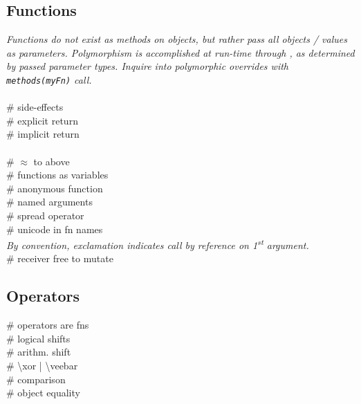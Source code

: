 \subsection*{Functions}
\textit{Functions do not exist as methods on  objects, but rather pass all objects / values as parameters. Polymorphism is accomplished at run-time through , as determined by passed parameter types. Inquire into polymorphic overrides with \texttt{methods(myFn)} call.}\\
\\
 \# side-effects \\
 \# explicit return \\
 \# implicit return \\
\\
 \# $\approx$ to above\\
 \# functions as variables\\
 \# anonymous function \\
 \# named arguments \\
 \# spread operator \\
 \# unicode in fn names\\[2mm]
\textit{By convention, exclamation indicates call by reference on 1\textsuperscript{st} argument.} \\
 \# receiver free to mutate\\



\subsection*{Operators}
 \# operators are fns \\
\mycolX{30mm}{\code{$>>\hspace{3mm}<<$}} \# logical shifts\\
\mycolX{30mm}{\code{$>>>\hspace{3mm}<<<$}} \# arithm. shift \\
\mycolX{30mm}{\code{$\veebar$}} \# \textbackslash xor | \textbackslash veebar \\
\mycolX{30mm}{\code{==}} \# comparison \\
\mycolX{30mm}{\code{===}} \# object equality \\


